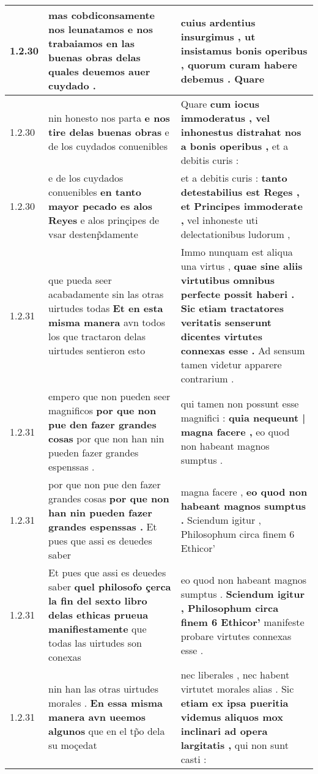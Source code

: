 \begin{tabular}{|p{1cm}|p{6.5cm}|p{6.5cm}|}
1.2.30 & mas cobdiconsamente nos leunatamos \textbf{ e nos trabaiamos en las buenas obras } delas quales deuemos auer cuydado . & cuius ardentius insurgimus , \textbf{ ut insistamus bonis operibus , quorum curam habere debemus . } Quare \\\hline
1.2.30 & nin honesto nos parta \textbf{ e nos tire delas buenas obras } e de los cuydados conuenibles & Quare \textbf{ cum iocus immoderatus , vel inhonestus distrahat nos a bonis operibus , } et a debitis curis : \\\hline
1.2.30 & e de los cuydados conuenibles \textbf{ en tanto mayor pecado es alos Reyes } e alos prinçipes de vsar destenp̃damente & et a debitis curis : \textbf{ tanto detestabilius est Reges , et Principes immoderate , } vel inhoneste uti delectationibus ludorum , \\\hline
1.2.31 & que pueda seer acabadamente sin las otras uirtudes todas \textbf{ Et en esta misma manera } avn todos los que tractaron delas uirtudes sentieron esto & Immo nunquam est aliqua una virtus , \textbf{ quae sine aliis virtutibus omnibus perfecte possit haberi . Sic etiam tractatores veritatis senserunt dicentes virtutes connexas esse . } Ad sensum tamen videtur apparere contrarium . \\\hline
1.2.31 & empero que non pueden seer magnificos \textbf{ por que non pue den fazer grandes cosas } por que non han nin pueden fazer grandes espenssas . & qui tamen non possunt esse magnifici : \textbf{ quia nequeunt | magna facere , } eo quod non habeant magnos sumptus . \\\hline
1.2.31 & por que non pue den fazer grandes cosas \textbf{ por que non han nin pueden fazer grandes espenssas . } Et pues que assi es deuedes saber & magna facere , \textbf{ eo quod non habeant magnos sumptus . } Sciendum igitur , Philosophum circa finem 6 Ethicor’ \\\hline
1.2.31 & Et pues que assi es deuedes saber \textbf{ quel philosofo çerca la fin del sexto libro delas ethicas prueua manifiestamente } que todas las uirtudes son conexas & eo quod non habeant magnos sumptus . \textbf{ Sciendum igitur , Philosophum circa finem 6 Ethicor’ } manifeste probare virtutes connexas esse . \\\hline
1.2.31 & nin han las otras uirtudes morales . \textbf{ En essa misma manera avn ueemos algunos } que en el tp̃o dela su moçedat & nec liberales , nec habent virtutet morales alias . Sic \textbf{ etiam ex ipsa pueritia videmus aliquos mox inclinari ad opera largitatis , } qui non sunt casti : \\\hline

\end{tabular}
